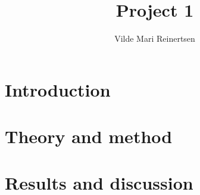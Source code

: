 \documentclass[a4paper,12pt]{article}
\date{}
\author{Vilde Mari Reinertsen}
\title{Project 1}
\begin{document}
\begingroup
\let\center\flushleft
\let\endcenter\endflushleft
\maketitle
\endgroup


\section{Introduction}


\section{Theory and method}


\section{Results and discussion}


\begin{appendices}

\end{appendices}


\newpage

\end{document}
